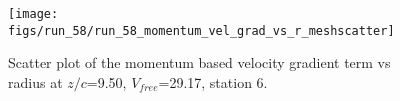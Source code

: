 \begin{figure}[H]
\centering
\texttt{[image: figs/run\_58/run\_58\_momentum\_vel\_grad\_vs\_r\_meshscatter]}
\caption{Scatter plot of the momentum based velocity gradient term vs radius at $z/c$=9.50, $V_{free}$=29.17, station 6.}
\label{fig:run_58_momentum_vel_grad_vs_r_meshscatter}
\end{figure}


